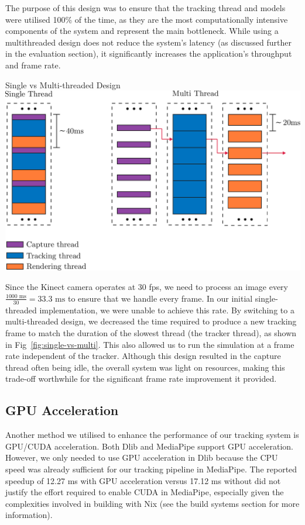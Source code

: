 The purpose of this design was to ensure that the tracking thread and models were utilised 100\% of the time, as they are the most computationally intensive components of the system and represent the main bottleneck. While using a multithreaded design does not reduce the system's latency (as discussed further in the evaluation section), it significantly increases the application's throughput and frame rate.

\begin{figureBox}[label={fig:single-vs-multi}, width=0.75\linewidth]{Single vs Multi-threaded Design}
    \includegraphics[width=0.8\linewidth]{./implementation/figures/single-vs-multi.pdf}
\end{figureBox}

Since the Kinect camera operates at 30 fps, we need to process an image every $ \frac{1000 \text{ ms}}{30} = 33.3 \text{ ms}$ to ensure that we handle every frame. In our initial single-threaded implementation, we were unable to achieve this rate. By switching to a multi-threaded design, we decreased the time required to produce a new tracking frame to match the duration of the slowest thread (the tracker thread), as shown in Fig~\ref{fig:single-vs-multi}. This also allowed us to run the simulation at a frame rate independent of the tracker. Although this design resulted in the capture thread often being idle, the overall system was light on resources, making this trade-off worthwhile for the significant frame rate improvement it provided.


\subsection{GPU Acceleration}

Another method we utilised to enhance the performance of our tracking system is GPU/CUDA acceleration. Both Dlib and MediaPipe support GPU acceleration. However, we only needed to use GPU acceleration in Dlib because the CPU speed was already sufficient for our tracking pipeline in MediaPipe. The reported speedup of 12.27 ms with GPU acceleration versus 17.12 ms without \cite{noauthor_hand_nodate} did not justify the effort required to enable CUDA in MediaPipe, especially given the complexities involved in building with Nix (see the build systems section for more information). \\

